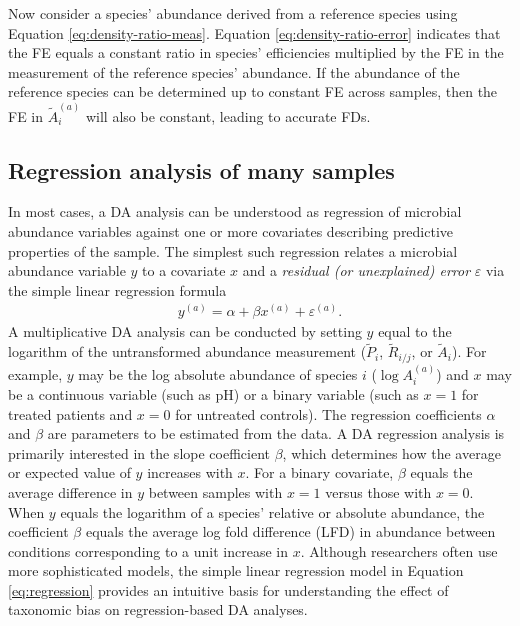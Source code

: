 \documentclass[
]{article}
\begin{document}
Now consider a species' abundance derived from a reference species using Equation \eqref{eq:density-ratio-meas}.
Equation \eqref{eq:density-ratio-error} indicates that the FE equals a constant ratio in species' efficiencies multiplied by the FE in the measurement of the reference species' abundance.
If the abundance of the reference species can be determined up to constant FE across samples, then the FE in \(\tilde A_i^{(a)}\) will also be constant, leading to accurate FDs.

\hypertarget{regression-analysis-of-many-samples}{%
\subsection{Regression analysis of many samples}\label{regression-analysis-of-many-samples}}

In most cases, a DA analysis can be understood as regression of microbial abundance variables against one or more covariates describing predictive properties of the sample.
The simplest such regression relates a microbial abundance variable \(y\) to a covariate \(x\) and a \emph{residual (or unexplained) error} \(\varepsilon\) via the simple linear regression formula
\begin{align}
  \label{eq:regression}
  y^{(a)} = \alpha + \beta x^{(a)} + \varepsilon^{(a)}.
\end{align}
A multiplicative DA analysis can be conducted by setting \(y\) equal to the logarithm of the untransformed abundance measurement (\(\tilde P_i\), \(\tilde R_{i/j}\), or \(\tilde A_i\)).
For example, \(y\) may be the log absolute abundance of species \(i\) (\(\log A_i^{(a)}\)) and \(x\) may be a continuous variable (such as pH) or a binary variable (such as \(x=1\) for treated patients and \(x=0\) for untreated controls).
The regression coefficients \(\alpha\) and \(\beta\) are parameters to be estimated from the data.
A DA regression analysis is primarily interested in the slope coefficient \(\beta\), which determines how the average or expected value of \(y\) increases with \(x\).
For a binary covariate, \(\beta\) equals the average difference in \(y\) between samples with \(x=1\) versus those with \(x=0\).
When \(y\) equals the logarithm of a species' relative or absolute abundance, the coefficient \(\beta\) equals the average log fold difference (LFD) in abundance between conditions corresponding to a unit increase in \(x\).
Although researchers often use more sophisticated models, the simple linear regression model in Equation \eqref{eq:regression} provides an intuitive basis for understanding the effect of taxonomic bias on regression-based DA analyses.
\end{document}
